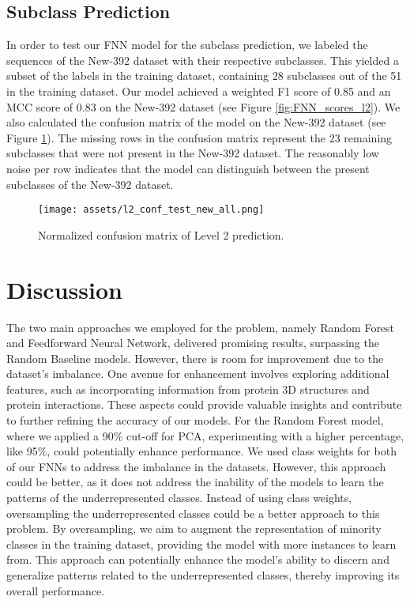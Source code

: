 \documentclass{bioinfo}
\begin{document}
\subsection{Subclass Prediction}
In order to test our FNN model for the subclass prediction, we labeled the sequences of the New-392 dataset with their respective subclasses.
This yielded a subset of the labels in the training dataset, containing 28 subclasses out of the 51 in the training dataset.
Our model achieved a weighted F1 score of 0.85 and an MCC score of 0.83 on the New-392 dataset (see Figure \ref{fig:FNN_scores_l2}).
We also calculated the confusion matrix of the model on the New-392 dataset (see Figure \ref{fig:FNN_conf_l2}).
The missing rows in the confusion matrix represent the 23 remaining subclasses that were not present in the New-392 dataset.
The reasonably low noise per row indicates that the model can distinguish between the present subclasses of the New-392 dataset.


\begin{figure}[!b]
\texttt{[image: assets/l2\_conf\_test\_new\_all.png]}
\caption{Normalized confusion matrix of Level 2 prediction.}\label{fig:FNN_conf_l2}
\end{figure}

\section{Discussion}
The two main approaches we employed for the problem, namely Random Forest and Feedforward Neural Network, delivered promising results, surpassing the Random Baseline models.
However, there is room for improvement due to the dataset's imbalance.
One avenue for enhancement involves exploring additional features, such as incorporating information from protein 3D structures and protein interactions.
These aspects could provide valuable insights and contribute to further refining the accuracy of our models.
For the Random Forest model, where we applied a 90\% cut-off for PCA, experimenting with a higher percentage, 
like 95\%, could potentially enhance performance.
We used class weights for both of our FNNs to address the imbalance in the datasets.
However, this approach could be better, as it does not address the inability of the models to learn the patterns of the underrepresented classes.
Instead of using class weights, oversampling the underrepresented classes could be a better approach to this problem.
By oversampling, we aim to augment the representation of minority classes in the training dataset, 
providing the model with more instances to learn from. 
This approach can potentially enhance the model's ability to discern and generalize patterns related to the underrepresented 
classes, thereby improving its overall performance.
\end{document}
